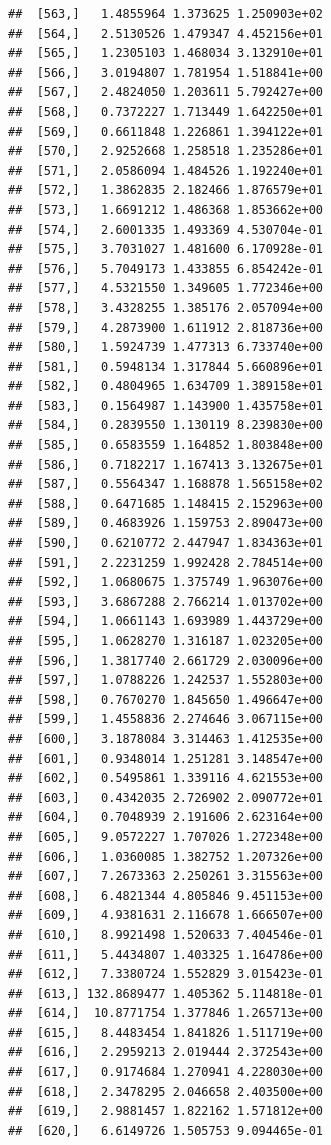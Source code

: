\documentclass[article]{jss}\usepackage[]{graphicx}\usepackage[]{xcolor}
\makeatletter
\newenvironment{kframe}{%
 \def\at@end@of@kframe{}%
 \ifinner\ifhmode%
  \def\at@end@of@kframe{\end{minipage}}%
  \begin{minipage}{\columnwidth}%
 \fi\fi%
 \def\FrameCommand##1{\hskip\@totalleftmargin \hskip-\fboxsep
 \colorbox{shadecolor}{##1}\hskip-\fboxsep
     \hskip-\linewidth \hskip-\@totalleftmargin \hskip\columnwidth}%
 \MakeFramed {\advance\hsize-\width
   \@totalleftmargin\z@ \linewidth\hsize
   \@setminipage}}%
 {\par\unskip\endMakeFramed%
 \at@end@of@kframe}
\newenvironment{knitrout}{}{} %
\makeatother
\begin{document}
\begin{knitrout}
\begin{kframe}
\begin{verbatim}
##  [563,]   1.4855964 1.373625 1.250903e+02
##  [564,]   2.5130526 1.479347 4.452156e+01
##  [565,]   1.2305103 1.468034 3.132910e+01
##  [566,]   3.0194807 1.781954 1.518841e+00
##  [567,]   2.4824050 1.203611 5.792427e+00
##  [568,]   0.7372227 1.713449 1.642250e+01
##  [569,]   0.6611848 1.226861 1.394122e+01
##  [570,]   2.9252668 1.258518 1.235286e+01
##  [571,]   2.0586094 1.484526 1.192240e+01
##  [572,]   1.3862835 2.182466 1.876579e+01
##  [573,]   1.6691212 1.486368 1.853662e+00
##  [574,]   2.6001335 1.493369 4.530704e-01
##  [575,]   3.7031027 1.481600 6.170928e-01
##  [576,]   5.7049173 1.433855 6.854242e-01
##  [577,]   4.5321550 1.349605 1.772346e+00
##  [578,]   3.4328255 1.385176 2.057094e+00
##  [579,]   4.2873900 1.611912 2.818736e+00
##  [580,]   1.5924739 1.477313 6.733740e+00
##  [581,]   0.5948134 1.317844 5.660896e+01
##  [582,]   0.4804965 1.634709 1.389158e+01
##  [583,]   0.1564987 1.143900 1.435758e+01
##  [584,]   0.2839550 1.130119 8.239830e+00
##  [585,]   0.6583559 1.164852 1.803848e+00
##  [586,]   0.7182217 1.167413 3.132675e+01
##  [587,]   0.5564347 1.168878 1.565158e+02
##  [588,]   0.6471685 1.148415 2.152963e+00
##  [589,]   0.4683926 1.159753 2.890473e+00
##  [590,]   0.6210772 2.447947 1.834363e+01
##  [591,]   2.2231259 1.992428 2.784514e+00
##  [592,]   1.0680675 1.375749 1.963076e+00
##  [593,]   3.6867288 2.766214 1.013702e+00
##  [594,]   1.0661143 1.693989 1.443729e+00
##  [595,]   1.0628270 1.316187 1.023205e+00
##  [596,]   1.3817740 2.661729 2.030096e+00
##  [597,]   1.0788226 1.242537 1.552803e+00
##  [598,]   0.7670270 1.845650 1.496647e+00
##  [599,]   1.4558836 2.274646 3.067115e+00
##  [600,]   3.1878084 3.314463 1.412535e+00
##  [601,]   0.9348014 1.251281 3.148547e+00
##  [602,]   0.5495861 1.339116 4.621553e+00
##  [603,]   0.4342035 2.726902 2.090772e+01
##  [604,]   0.7048939 2.191606 2.623164e+00
##  [605,]   9.0572227 1.707026 1.272348e+00
##  [606,]   1.0360085 1.382752 1.207326e+00
##  [607,]   7.2673363 2.250261 3.315563e+00
##  [608,]   6.4821344 4.805846 9.451153e+00
##  [609,]   4.9381631 2.116678 1.666507e+00
##  [610,]   8.9921498 1.520633 7.404546e-01
##  [611,]   5.4434807 1.403325 1.164786e+00
##  [612,]   7.3380724 1.552829 3.015423e-01
##  [613,] 132.8689477 1.405362 5.114818e-01
##  [614,]  10.8771754 1.377846 1.265713e+00
##  [615,]   8.4483454 1.841826 1.511719e+00
##  [616,]   2.2959213 2.019444 2.372543e+00
##  [617,]   0.9174684 1.270941 4.228030e+00
##  [618,]   2.3478295 2.046658 2.403500e+00
##  [619,]   2.9881457 1.822162 1.571812e+00
##  [620,]   6.6149726 1.505753 9.094465e-01

\end{verbatim}
\end{kframe}
\end{knitrout}
\end{document}
